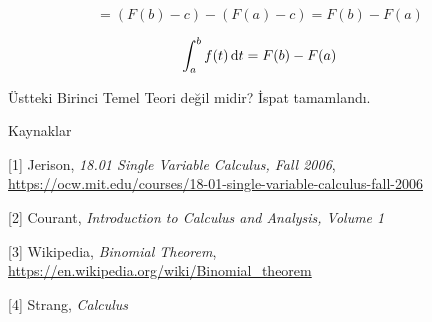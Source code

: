 \documentclass[12pt,fleqn]{article}\usepackage{../../common}
\begin{document}
$$
= ( F(b) - c ) - (F(a) - c) = F(b) - F(a)
$$

$$
\int _{a}^{b} f(t) \,\mathrm{d} t =  F(b) - F(a)
$$

Üstteki Birinci Temel Teori değil midir? İspat tamamlandı.


Kaynaklar

[1] Jerison, {\em 18.01 Single Variable Calculus, Fall 2006},
    \url{https://ocw.mit.edu/courses/18-01-single-variable-calculus-fall-2006}

[2] Courant, {\em Introduction to Calculus and Analysis, Volume 1}

[3] Wikipedia, {\em Binomial Theorem},
    \url{https://en.wikipedia.org/wiki/Binomial_theorem}
    
[4] Strang, {\em Calculus}
\end{document}
